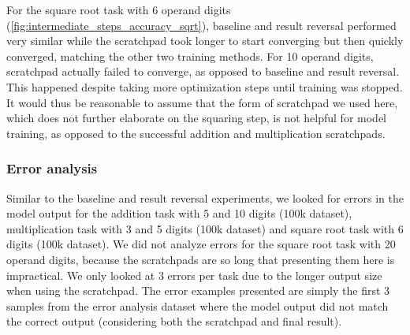 For the square root task with 6 operand digits (\cref{fig:intermediate_steps_accuracy_sqrt}), baseline and result reversal performed very similar while the scratchpad took longer to start converging but then quickly converged, matching the other two training methods.
For 10 operand digits, scratchpad actually failed to converge, as opposed to baseline and result reversal. This happened despite taking more optimization steps until training was stopped. It would thus be reasonable to assume that the form of scratchpad we used here, which does not further elaborate on the squaring step, is not helpful for model training, as opposed to the successful addition and multiplication scratchpads.








\FloatBarrier
\subsubsection{Error analysis}

Similar to the baseline and result reversal experiments, we looked for errors in the model output for the addition task with 5 and 10 digits (100k dataset), multiplication task with 3 and 5 digits (100k dataset) and square root task with 6 digits (100k dataset).
We did not analyze errors for the square root task with 20 operand digits, because the scratchpads are so long that presenting them here is impractical.
We only looked at 3 errors per task due to the longer output size when using the scratchpad. The error examples presented are simply the first 3 samples from the error analysis dataset where the model output did not match the correct output (considering both the scratchpad and final result).

